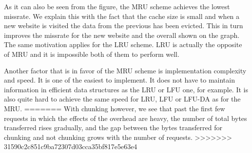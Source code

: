 As it can also be seen from the figure, the MRU scheme achieves the lowest missrate. We explain this with the fact that
the cache size is small and when a new website is visited the data from the previous has been evicted. This in turn
improves the missrate for the new website and the overall shown on the graph. The same motivation applies for the 
LRU scheme. LRU is actually the opposite of MRU and it is impossible both of them to perform well. 

Another factor that is in favor of the MRU scheme is implementation complexity and speed. It is one of the easiest to
implement. It does not have to maintain information in efficient data structures as the LRU or LFU one, for example. 
It is also quite hard to achieve the same speed for LRU, LFU or LFU-DA as for the MRU.
=======
With chunking however, we see that past the first few requests in which the effects of the overhead are heavy, the number of total bytes transferred rises gradually, and the gap between the bytes transferred for chunking and not chunking grows with the number of requests.
>>>>>>> 31590c2c851c9ba72307d03cca35bf817e5e63e4

